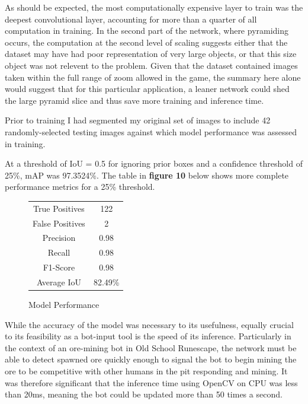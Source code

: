 \documentclass[sigconf]{acmart}
\begin{document}
As should be expected, the most computationally expensive layer to train was the deepest convolutional layer, accounting for more than a quarter of all computation in training. In the second part of the network, where pyramiding occurs, the computation at the second level of scaling suggests either that the dataset may have had poor representation of very large objects, or that this size object was not relevent to the problem. Given that the dataset contained images taken within the full range of zoom allowed in the game, the summary here alone would suggest that for this particular application, a leaner network could shed the large pyramid slice and thus save more training and inference time.

Prior to training I had segmented my original set of images to include 42 randomly-selected testing images against which model performance was assessed in training. 

At a threshold of IoU = 0.5 for ignoring prior boxes and a confidence threshold of 25\%, mAP was 97.3524\%. The table in \textbf{figure 10} below shows more complete performance metrics for a 25\% threshold.

\begin{figure}
    \centering
    \begin{center}
\begin{tabular}{ |c|c| } 
 \hline
 True Positives & 122 \\ 
 False Positives & 2 \\ 
 Precision & 0.98 \\ 
 Recall & 0.98 \\ 
 F1-Score & 0.98 \\ 
 Average IoU & 82.49\% \\ 
 \hline
\end{tabular}
\end{center}
    \caption{Model Performance}
    \label{fig:perf}
\end{figure}

While the accuracy of the model was necessary to its usefulness, equally crucial to its feasibility as a bot-input tool is the speed of its inference. Particularly in the context of an ore-mining bot in Old School Runescape, the network must be able to detect spawned ore quickly enough to signal the bot to begin mining the ore to be competitive with other humans in the pit responding and mining. It was therefore significant that the inference time using OpenCV on CPU was less than 20ms, meaning the bot could be updated more than 50 times a second. 
\end{document}
